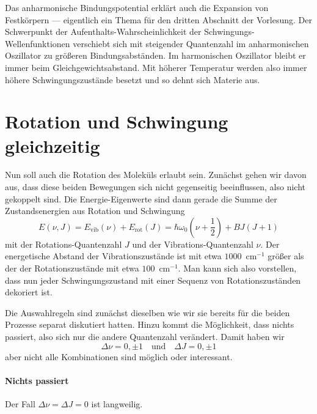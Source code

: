  
 
Das anharmonische Bindungspotential erklärt auch die Expansion von Festkörpern --- eigentlich ein Thema für den dritten Abschnitt der Vorlesung. Der Schwerpunkt der Aufenthalts-Wahrscheinlichkeit der Schwingungs-Wellenfunktionen verschiebt sich mit steigender Quantenzahl im anharmonischen Oszillator zu größeren Bindungsabständen. Im harmonischen Oszillator bleibt er immer beim Gleichgewichtsabstand. Mit höherer Temperatur werden also immer höhere Schwingungszustände besetzt und so dehnt sich Materie aus.


\section{Rotation und Schwingung gleichzeitig}

Nun soll auch die Rotation des Moleküls erlaubt sein. Zunächst gehen wir davon aus, dass diese beiden Bewegungen sich nicht gegenseitig beeinflussen, also nicht gekoppelt sind. Die Energie-Eigenwerte sind dann gerade die Summe der Zustandsenergien aus Rotation und Schwingung
\begin{equation}
E (\nu, J) = E_\text{vib}(\nu) + E_\text{rot}(J) = \hbar \omega_0 \left(\nu + \frac{1}{2} \right) + B J \left( J+1 \right) \label{eq:vib_rot_simple}
\end{equation}
mit der Rotations-Quantenzahl $J$ und der Vibrations-Quantenzahl $\nu$. Der energetische Abstand der Vibrationszustände ist mit etwa $1000$~cm$^{-1}$  größer als der der Rotationszustände mit etwa $100$~cm$^{-1}$. Man kann sich also vorstellen, dass nun jeder Schwingungszustand mit einer Sequenz von Rotationszuständen dekoriert ist.

Die Auswahlregeln sind zunächst dieselben wie wir sie bereits für die beiden Prozesse separat diskutiert hatten. Hinzu kommt die Möglichkeit, dass nichts passiert, also sich nur die andere Quantenzahl verändert. Damit haben wir
\begin{equation}
 \Delta \nu = 0, \pm 1 \quad \text{und} \quad \Delta J = 0, \pm 1 
\end{equation}
aber nicht alle Kombinationen sind möglich oder interessant.

\paragraph{Nichts passiert} Der Fall $\Delta \nu = \Delta J = 0$ ist langweilig.

